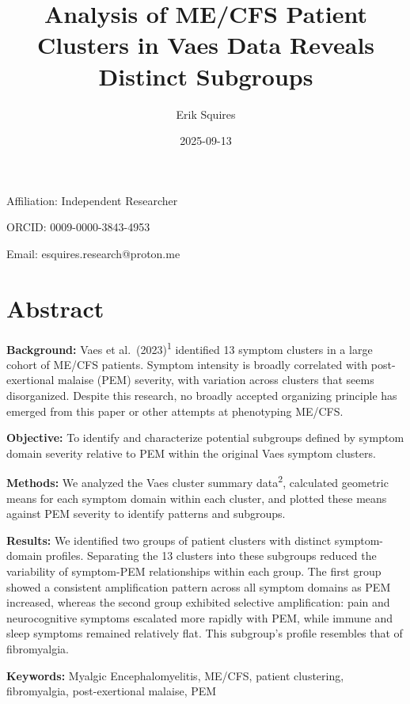 \documentclass[
  letterpaper,
  DIV=11,
  numbers=noendperiod]{scrartcl}
\title{Analysis of ME/CFS Patient Clusters in Vaes Data Reveals Distinct
Subgroups}
\author{Erik Squires}
\date{2025-09-13}
\begin{document}
\maketitle


Affiliation: Independent Researcher

ORCID: 0009-0000-3843-4953

Email: esquires.research@proton.me

\section*{Abstract}\label{abstract}

\textbf{Background:} Vaes et al.~(2023)\textsuperscript{1} identified 13
symptom clusters in a large cohort of ME/CFS patients. Symptom intensity
is broadly correlated with post-exertional malaise (PEM) severity, with
variation across clusters that seems disorganized. Despite this
research, no broadly accepted organizing principle has emerged from this
paper or other attempts at phenotyping ME/CFS.

\textbf{Objective:} To identify and characterize potential subgroups
defined by symptom domain severity relative to PEM within the original
Vaes symptom clusters.

\textbf{Methods:} We analyzed the Vaes cluster summary
data\textsuperscript{2}, calculated geometric means for each symptom
domain within each cluster, and plotted these means against PEM severity
to identify patterns and subgroups.

\textbf{Results:} We identified two groups of patient clusters with
distinct symptom-domain profiles. Separating the 13 clusters into these
subgroups reduced the variability of symptom-PEM relationships within
each group. The first group showed a consistent amplification pattern
across all symptom domains as PEM increased, whereas the second group
exhibited selective amplification: pain and neurocognitive symptoms
escalated more rapidly with PEM, while immune and sleep symptoms
remained relatively flat. This subgroup's profile resembles that of
fibromyalgia.

\textbf{Keywords:} Myalgic Encephalomyelitis, ME/CFS, patient
clustering, fibromyalgia, post-exertional malaise, PEM

\newpage{}

\tableofcontents

\newpage{}

\listoffigures
\listoftables
\end{document}
